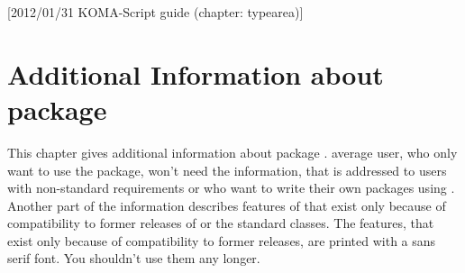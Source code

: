 %
%
%
%
%
%
%
%
% 
%
%
%
%

[2012/01/31 KOMA-Script guide (chapter: typearea)]


\chapter{Additional Information about package }

This chapter gives additional information about package
.  average user, who only want to use the package, won't need
the information, that is addressed to users with non-standard requirements or
who want to write their own packages using . Another part of
the information describes features of  that exist only
because of compatibility to former releases of \KOMAScript{} or the standard
classes. The features, that exist only because of compatibility to former
\KOMAScript{} releases, are printed with a sans serif font. You shouldn't use
them any longer.


